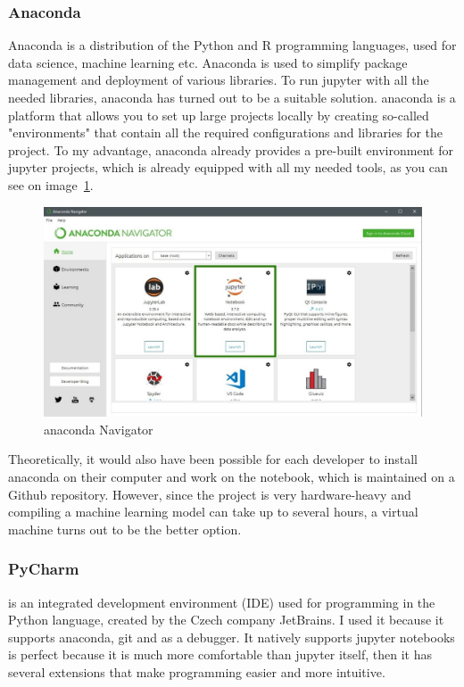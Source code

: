 \subsubsection{Anaconda}
Anaconda is a distribution of the Python and R programming languages, used for data science, machine learning etc.
Anaconda is used to simplify package management and deployment of various libraries.
To run \gls{jupyter} with all the needed libraries, \gls{anaconda} has turned out to be a suitable solution. \gls{anaconda} is a platform that allows you to set up large projects locally by creating so-called "environments" that contain all the required configurations and libraries for the project. To my advantage, \gls{anaconda} already provides a pre-built environment for \gls{jupyter} projects, which is already equipped with all my needed tools, as you can see on image~\ref{fig:fig_01}.

\begin{figure}[ht!]
\centering
\includegraphics[width=1\textwidth]{images/anaconda.jpg}
\caption{\gls{anaconda} Navigator}
\label{fig:fig_01}
\end{figure}
\FloatBarrier

Theoretically, it would also have been possible for each developer to install \gls{anaconda} on their computer and work on the notebook, which is maintained on a Github repository. However, since the project is very hardware-heavy and compiling a machine learning model can take up to several hours, a \gls{virtual machine} turns out to be the better option.

\subsubsection{PyCharm}
is an integrated development environment (IDE) used for programming in the Python language, created by the Czech company JetBrains. I used it because it supports anaconda, git and as a debugger.
It natively supports jupyter notebooks is perfect because it is much more comfortable than jupyter itself, then it has several extensions that make programming easier and more intuitive.

